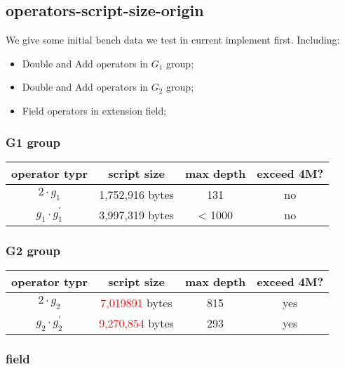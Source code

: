 \subsection{operators-script-size-origin}

We give some initial bench data we test in current implement first. Including:

\begin{itemize}
    \item Double and Add operators in $G_1$ group;
    \item Double and Add operators in $G_2$ group;
    \item Field operators in extension field;
\end{itemize}

\subsubsection{G1 group}

\begin{tabular}{|c|c|c|c|} \hline
operator typr & script size & max depth & exceed 4M? \\ \hline
$2 \cdot g_1$ & 1,752,916 bytes & 131 & no  \\ \hline
$g_1 \cdot g_1^{'}$ & 3,997,319 bytes &	< 1000 & no \\ \hline
\end{tabular}

\subsubsection{G2 group}

\begin{tabular}{|c|c|c|c|} \hline
operator typr & script size & max depth & exceed 4M? \\ \hline
$2 \cdot g_2$ & \textcolor{red}{7,019891} bytes & 815 & yes  \\ \hline
$g_2 \cdot g_2^{'}$ & \textcolor{red}{9,270,854} bytes &	293 & yes \\ \hline
\end{tabular}

\subsubsection{field}

